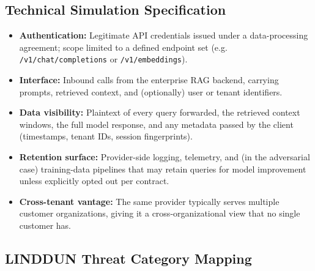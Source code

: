 \documentclass[12pt, a4paper]{report}
\begin{document}
\subsection{Technical Simulation Specification}

\begin{prosebox}
\begin{itemize}[leftmargin=1.4em, itemsep=3pt]
  \item \textbf{Authentication:} Legitimate API credentials issued under a
        data-processing agreement; scope limited to a defined endpoint set
        (e.g. \texttt{/v1/chat/completions} or \texttt{/v1/embeddings}).
  \item \textbf{Interface:} Inbound calls from the enterprise RAG backend,
        carrying prompts, retrieved context, and (optionally) user or
        tenant identifiers.
  \item \textbf{Data visibility:} Plaintext of every query forwarded, the
        retrieved context windows, the full model response, and any
        metadata passed by the client (timestamps, tenant IDs, session
        fingerprints).
  \item \textbf{Retention surface:} Provider-side logging, telemetry, and
        (in the adversarial case) training-data pipelines that may
        retain queries for model improvement unless explicitly opted out
        per contract.
  \item \textbf{Cross-tenant vantage:} The same provider typically serves
        multiple customer organizations, giving it a cross-organizational
        view that no single customer has.
\end{itemize}
\end{prosebox}

\subsection{LINDDUN Threat Category Mapping}
\end{document}
